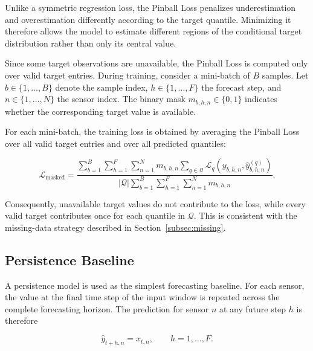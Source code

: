 Unlike a symmetric regression loss, the Pinball Loss penalizes
underestimation and overestimation differently according to the target
quantile. Minimizing it therefore allows the model to estimate different
regions of the conditional target distribution rather than only its central
value.


Since some target observations are unavailable, the Pinball Loss is computed
only over valid target entries. During training, consider a mini-batch of
$B$ samples. Let $b \in \{1,\ldots,B\}$ denote the sample index,
$h \in \{1,\ldots,F\}$ the forecast step, and
$n \in \{1,\ldots,N\}$ the sensor index. The binary mask
$m_{b,h,n} \in \{0,1\}$ indicates whether the corresponding target value is
available.

For each mini-batch, the training loss is obtained by averaging the Pinball
Loss over all valid target entries and over all predicted quantiles:

\begin{equation}
    \mathcal{L}_{\mathrm{masked}}
    =
    \frac{
        \displaystyle
        \sum_{b=1}^{B}
        \sum_{h=1}^{F}
        \sum_{n=1}^{N}
        m_{b,h,n}
        \sum_{q\in\mathcal{Q}}
        \mathcal{L}_{q}
        \left(
            y_{b,h,n},
            \hat{y}_{b,h,n}^{(q)}
        \right)
    }{
        \displaystyle
        |\mathcal{Q}|
        \sum_{b=1}^{B}
        \sum_{h=1}^{F}
        \sum_{n=1}^{N}
        m_{b,h,n}
    }.
    \label{eq:masked_pinball}
\end{equation}

Consequently, unavailable target values do not contribute to the loss,
while every valid target contributes once for each quantile in
$\mathcal{Q}$. This is consistent with the missing-data strategy described
in Section~\ref{subsec:missing}.


\subsection{Persistence Baseline}
\label{subsec:persistence}

A persistence model is used as the simplest forecasting baseline. For each
sensor, the value at the final time step of the input window is repeated
across the complete forecasting horizon. The prediction for sensor $n$ at
any future step $h$ is therefore

\begin{equation}
    \hat{y}_{t+h,n} = x_{t,n},
    \qquad h=1,\ldots,F.
    \label{eq:persistence}
\end{equation}

